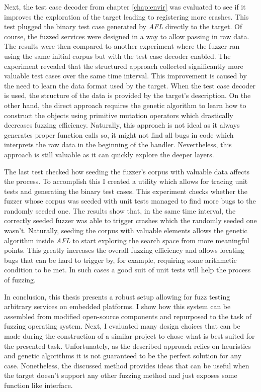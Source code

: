 Next, the test case decoder from chapter \ref{chap:envir} was evaluated to see if it improves the exploration of the target leading to registering more crashes. This test plugged the binary test case generated by \textit{AFL} directly to the target. Of course, the fuzzed services were designed in a way to allow passing in raw data. The results were then compared to another experiment where the fuzzer ran using the same initial corpus but with the test case decoder enabled. The experiment revealed that the structured approach collected significantly more valuable test cases over the same time interval. This improvement is caused by the need to learn the data format used by the target. When the test case decoder is used, the structure of the data is provided by the target's description. On the other hand, the direct approach requires the genetic algorithm to learn how to construct the objects using primitive mutation operators which drastically decreases fuzzing efficiency. Naturally, this approach is not ideal as it always generates proper function calls so, it might not find all bugs in code which interprets the raw data in the beginning of the handler. Nevertheless, this approach is still valuable as it can quickly explore the deeper layers.

The last test checked how seeding the fuzzer's corpus with valuable data affects the process. To accomplish this I created a utility which allows for tracing unit tests and generating the binary test cases. This experiment checks whether the fuzzer whose corpus was seeded with unit tests managed to find more bugs to the randomly seeded one. The results show that, in the same time interval, the correctly seeded fuzzer was able to trigger crashes which the randomly seeded one wasn't. Naturally, seeding the corpus with valuable elements allows the genetic algorithm inside \textit{AFL} to start exploring the search space from more meaningful points. This greatly increases the overall fuzzing efficiency and allows locating bugs that can be hard to trigger by, for example, requiring some arithmetic condition to be met. In such cases a good suit of unit tests will help the process of fuzzing.

In conclusion, this thesis presents a robust setup allowing for fuzz testing arbitrary services on embedded platforms. I show how this system can be assembled from modified open-source components and repurposed to the task of fuzzing operating system. Next, I evaluated many design choices that can be made during the construction of a similar project to chose what is best suited for the presented task. Unfortunately, as the described approach relies on heuristics and genetic algorithms it is not guaranteed to be the perfect solution for any case. Nonetheless, the discussed method provides ideas that can be useful when the target doesn't support any other fuzzing method and just exposes some function like interface.
